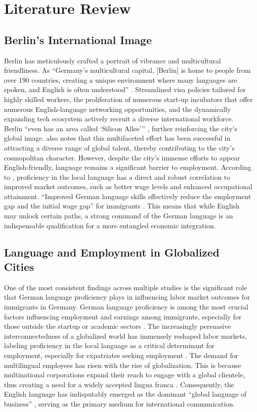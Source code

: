 \chapter{Literature Review}

\section{Berlin’s International Image}
Berlin has meticulously crafted a portrait of vibrance and multicultural friendliness. As “Germany’s multicultural capital, [Berlin] is home to people from over 190 countries, creating a unique environment where many languages are spoken, and English is often understood” \citep{kummuni25Language}. Streamlined visa policies tailored for highly skilled workers, the proliferation of numerous start-up incubators that offer numerous English-language networking opportunities, and the dynamically expanding tech ecosystem actively recruit a diverse international workforce. Berlin “even has an area called ‘Silicon Allee’” \citep{simplegermany25}, further reinforcing the city’s global image. \citet{bertelsmann} also notes that this multifaceted effort has been successful in attracting a diverse range of global talent, thereby contributing to the city’s cosmopolitan character.
However, despite the city’s immense efforts to appear English-friendly, language remains a significant barrier to employment. According to \citet{berbee24Mig}, proficiency in the local language has a direct and robust correlation to improved market outcomes, such as better wage levels and enhanced occupational attainment. “Improved German language skills effectively reduce the employment gap and the initial wage gap” for immigrants \citep{berbee24Mig}. This means that while English may unlock certain paths, a strong command of the German language is an indispensable qualification for a more entangled economic integration.


\section{Language and Employment in Globalized Cities}
One of the most consistent findings across multiple studies is the significant role that German language proficiency plays in influencing labor market outcomes for immigrants in Germany. German language proficiency is among the most crucial factors influencing employment and earnings among immigrants, especially for those outside the startup or academic sectors \citep{berbee24Mig}. The increasingly persuasive interconnectedness of a globalized world has immensely reshaped labor markets, labeling proficiency in the local language as a critical determinant for employment, especially for expatriates seeking employment \citep{Shohamy06}. The demand for multilingual employees has risen with the rise of globalization. This is because multinational corporations expand their reach to engage with a global clientele, thus creating a need for a widely accepted lingua franca \citep{LinguaFranca}. Consequently, the English language has indisputably emerged as the dominant “global language of business” \citep{Neeley2012}, serving as the primary medium for international communication.


